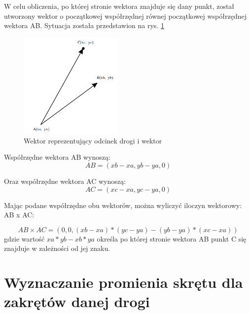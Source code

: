 W celu obliczenia, po której stronie wektora znajduje się dany punkt, został utworzony wektor o początkowej współrzędnej równej początkowej współrzędnej wektora AB. Sytuacja została przedstawion na rys. \ref{sec:VectorVector}


\begin{figure}[h]
\caption{Wektor reprezentujący odcinek drogi i wektor}
\label{sec:VectorVector}
\centering
\includegraphics[width=0.45\textwidth]{vectorVector}
\end{figure}

Współrzędne wektora AB wynoszą:
\begin{equation}
AB = (xb - xa, yb - ya, 0)
\end{equation}


Oraz współrzędne wektora AC wynoszą:
\begin{equation}
AC = (xc - xa, yc - ya, 0)
\end{equation}

Mając podane współrzędne obu wektorów, można wyliczyć iloczyn wektorowy: AB x AC:

\begin{equation}
AB \times AC = (0, 0, (xb - xa) * (yc - ya) - (yb - ya) * (xc - xa))
\end{equation}
gdzie wartość $xa * yb - xb * ya$ określa po której stronie wektora AB punkt C się znajduje w zależności od jej znaku. 

\section{Wyznaczanie promienia skrętu dla zakrętów danej drogi}
\label{sec:WyznaczaniePromieniaSkrętuDlaZakrętówDanejDrogi}

